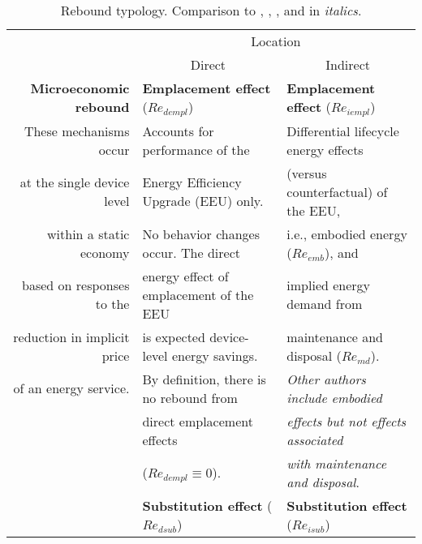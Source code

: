


\begin{table}
\footnotesize
\begin{center}
\caption{Rebound typology. Comparison to \citet{Sorrell:2009cg}, \citet{Jenkins2011}, 
                           \citet{Thomas:2013aa,Thomas:2013ab}, and \citet{Walnum2014} in \emph{italics}.}
\label{tab:rebound_typology}
\begin{tabular}{ r l l }
\toprule
                                   & \multicolumn{2}{c}{Location} \\ 
                                   & \multicolumn{1}{c}{Direct}                  & \multicolumn{1}{c}{Indirect} \\
                                   \cmidrule{2-3}
\textbf{Microeconomic rebound}     & \textbf{Emplacement effect} ($Re_{dempl}$)  & \textbf{Emplacement effect} ($Re_{iempl}$) \\
These mechanisms occur             & Accounts for performance of the             & Differential lifecycle energy effects \\
at the single device level         & Energy Efficiency Upgrade (EEU) only.       & (versus counterfactual) of the EEU, \\
within a static economy            & No behavior changes occur. The direct       & i.e., embodied energy ($Re_{emb}$), and \\
based on responses to the          & energy effect of emplacement of the EEU     & implied energy demand from \\
reduction in implicit price        & is expected device-level energy savings.    & maintenance and disposal ($Re_{md}$). \\
of an energy service.              & By definition, there is no rebound from     & \emph{Other authors include embodied} \\
                                   & direct emplacement effects                  & \emph{effects but not effects associated} \\
                                   & ($Re_{dempl} \equiv 0$).                    & \emph{with maintenance and disposal}. \\
                                   \cmidrule{2-3}
                                   & \textbf{Substitution effect} ($Re_{dsub}$)  & \textbf{Substitution effect} ($Re_{isub}$) \\

\end{tabular}
\end{center}
\end{table}

